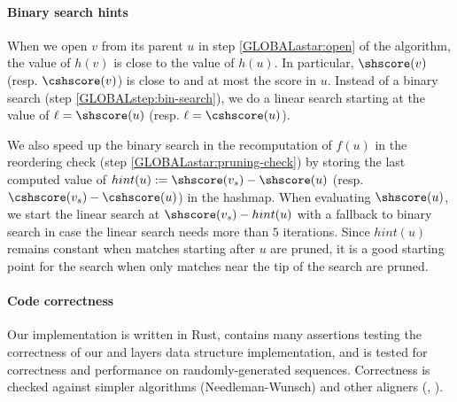 \paragraph{Binary search hints}
When we open $v$ from its parent $u$ in step \cref{GLOBALastar:open} of the \A
algorithm, the value of $h(v)$ is close to the value of $h(u)$. In particular,
$\shscore(v)$ (resp. $\cshscore(v)$) is close to and at most the score in $u$.
Instead of a binary search (step \cref{GLOBALstep:bin-search}), we do a
linear search starting at the value of $\ell=\shscore(u)$ (resp. $\ell=\cshscore(u)$).

We also speed up the binary search in the recomputation of $f(u)$ in the
reordering check (step \cref{GLOBALastar:pruning-check}) by storing the last computed
value of $hint(u):=\shscore(v_s) - \shscore(u)$ (resp.
$\cshscore(v_s) - \cshscore(u)$) in the hashmap. When evaluating $\shscore(u)$,
we start the linear search at $\shscore(v_s) - hint(u)$ with a fallback to
binary search in case the linear search needs more than $5$ iterations. Since
$hint(u)$ remains constant when matches starting after $u$ are pruned, it is a
good starting point for the search when only matches near the tip of the \A
search are pruned.

\paragraph{Code correctness}
Our implementation \astarpa is written in Rust, contains many assertions testing
\AG the correctness of our \A and layers data structure implementation,
and is tested for correctness and performance on randomly-generated sequences.
Correctness is checked against simpler algorithms (Needleman-Wunsch) and other
aligners (\edlib, \wfa).

